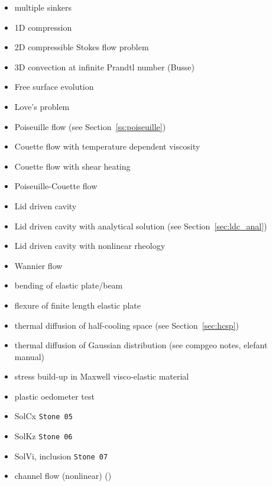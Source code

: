 \begin{itemize}
\item multiple sinkers \cite{mabl14,mabl15}
\item 1D compression \cite{modm02}
\item 2D compressible Stokes flow problem \cite{itki94,tagu07,lezh08,kilv10,lizh13}
\item 3D convection at infinite Prandtl number (Busse) \cite{bucc93,trha98,onmm06,krhb12}
\item Free surface evolution \cite{crsg12,aspectmanual}
\item Love's problem \cite{bebe04}
\item Poiseuille flow \cite{fojg94,fuku11,tagm09} (see Section~\ref{ss:poiseuille})
\item Couette flow with temperature dependent viscosity \cite{egat10,demh19}
\item Couette flow with shear heating \cite{egat10}
\item Poiseuille-Couette flow \cite{fusc13}
\item Lid driven cavity \cite{kawa61,chor67,shry78,foth79,ghgs82,kost84,bope98,xika01,brsa06,ertu09}
\item Lid driven cavity with analytical solution (see Section~\ref{sec:ldc_anal})
\item Lid driven cavity with nonlinear rheology \cite{been80,svna18}
\item Wannier flow \cite{wann50,yemu99,cehg14}
\item bending of elastic plate/beam \cite{cehg14,boht08a,vosc15,egat10,demh19,modm02,litu02}
\item flexure of finite length elastic plate \cite{chtl13}
\item thermal diffusion of half-cooling space (see Section~\ref{sec:hcsp}) 
\item thermal diffusion of Gaussian distribution (see compgeo notes, elefant manual)
\item stress build-up in Maxwell visco-elastic material \cite{geyu07,chtl13,egat10,demh19}
\item plastic oedometer test  \cite{chtl13}
\item SolCx \cite{dumg11,gemd13,mamo08,vemmXX,demh19,aspectmanual} {\tt Stone 05}
\item SolKz \cite{dumg11,gemd13,mamo08,vemmXX,demh19,aspectmanual} {\tt Stone 06}
\item SolVi, inclusion \cite{scpo03,kapo06,maie12,deka08,bepo10,sunh10,vosc15,demh19,aspectmanual,litu02} {\tt Stone 07}
\item channel flow (nonlinear) \cite{maie12,frbt19,gery10,egat10} (\bscthesis) 

\end{itemize}
